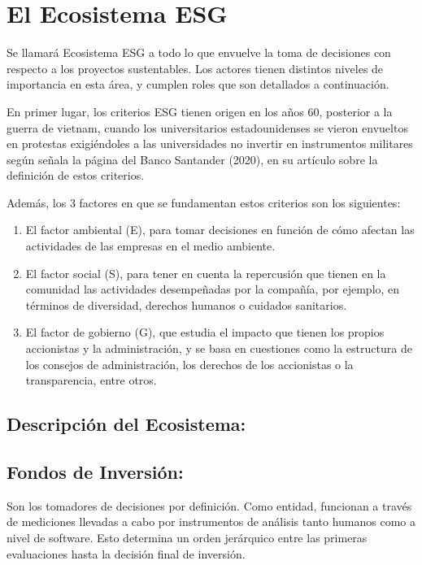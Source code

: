 \documentclass[11pt,letterpaper]{article}
\begin{document}
\newpage
\section{El Ecosistema ESG}

Se llamará Ecosistema ESG a todo lo que envuelve la toma de decisiones con respecto a los proyectos sustentables. Los actores tienen distintos niveles de importancia en esta área, y cumplen roles que son detallados a continuación. 

En primer lugar, los criterios ESG tienen origen en los años 60, posterior a la guerra de vietnam, cuando los universitarios estadounidenses se vieron envueltos en protestas exigiéndoles a las universidades no invertir en instrumentos militares según señala la página del Banco Santander (2020), en su artículo sobre la definición de estos criterios. 

Además, los 3 factores en que se fundamentan estos criterios son los siguientes:

\begin{enumerate}

\item El factor ambiental (E), para tomar decisiones en función de cómo afectan las actividades de las empresas en el medio ambiente.
\item El factor social (S), para tener en cuenta la repercusión que tienen en la comunidad las actividades desempeñadas por la compañía, por ejemplo, en términos de diversidad, derechos humanos o cuidados sanitarios.
\item El factor de gobierno (G), que estudia el impacto que tienen los propios accionistas y la administración, y se basa en cuestiones como la estructura de los consejos de administración, los derechos de los accionistas o la transparencia, entre otros.

\end{enumerate}

\subsection{Descripción del Ecosistema:}

\subsection{Fondos de Inversión:}

Son los tomadores de decisiones por definición. Como entidad, funcionan a través de mediciones llevadas a cabo por instrumentos de análisis tanto humanos como a nivel de software. Esto determina un orden jerárquico entre las primeras evaluaciones hasta la decisión final de inversión.
\end{document}
